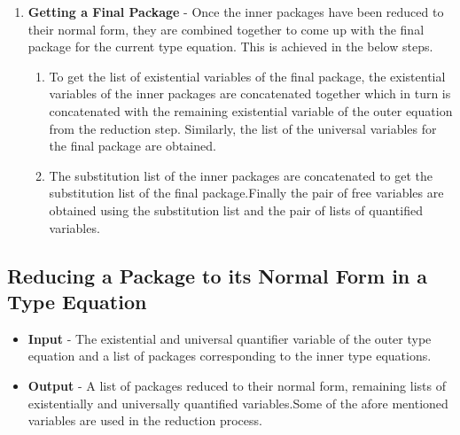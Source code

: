 \documentclass[11pt]{article}
\begin{document}
\begin{enumerate}
\begin{enumerate}
        \item {\bf Getting a Final Package } - Once the inner packages have been reduced to their normal form, they are combined together to come up with the final package for the current type equation. This is achieved in the below steps.
        \begin{enumerate}
          \setlength\itemsep{1em}
         \item To get the list of existential variables of the final package, the existential variables of the inner packages are concatenated together which in turn is concatenated with the remaining existential variable of the outer equation from the reduction step. Similarly, the list of the universal variables for the final package
         are obtained.  
         \item The substitution list of the inner packages are concatenated to get the substitution list of the final package.Finally the pair of free variables are obtained using the substitution list and the pair of lists of quantified variables. 
        \end {enumerate}
    \end{enumerate}
\end{enumerate}

\subsection {Reducing a Package to its Normal Form in a Type Equation} \label{RedPack}
\begin{itemize}
    \item {\bf Input } - The existential and universal quantifier variable of the outer type equation and a list of packages corresponding to the inner type equations.   
    \item {\bf Output} - A list of packages reduced to their normal form, remaining lists of existentially and universally quantified variables.Some of the afore mentioned variables are used in the reduction process.
\end{itemize}
\end{document}
